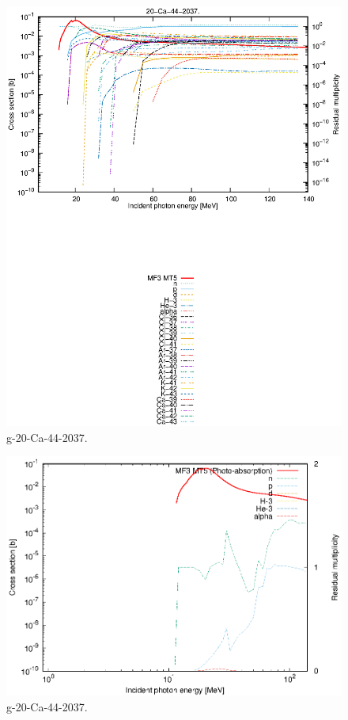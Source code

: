 \begin{figure}
 \includegraphics[width=\linewidth]{eps/g_20-Ca-44_2037.eps}
  \caption{g-20-Ca-44-2037.}
\end{figure}
\newpage \clearpage

\begin{figure}
 \includegraphics[width=\linewidth]{eps-log/g_20-Ca-44_2037.eps}
 \caption{g-20-Ca-44-2037.}
\end{figure}
\newpage \clearpage

